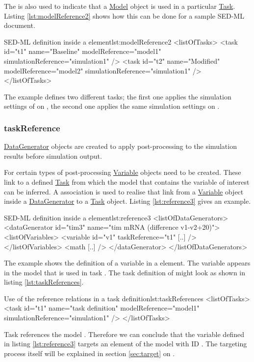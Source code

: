 The  is also used to indicate that a \hyperref[class:model]{Model} object is used in a particular  \hyperref[class:task]{Task}. Listing \ref{lst:modelReference2} shows how this can be done for a sample SED-ML document.
%
\begin{myXmlLst}{SED-ML  definition inside a  element}{lst:modelReference2}
<listOfTasks>
 <task id="t1" name="Baseline" modelReference="model1" simulationReference="simulation1" />
 <task id="t2" name="Modified" modelReference="model2" simulationReference="simulation1" />
</listOfTasks>
\end{myXmlLst}
%
The example defines two different tasks; the first one applies the simulation settings of  on , the second one applies the same simulation settings on .

\subsubsection{taskReference}
\label{sec:taskReference}
\hyperref[class:dataGenerator]{DataGenerator} objects are created to apply post-processing to the simulation results before simulation output. 

For certain types of post-processing \hyperref[class:variable]{Variable} objects need to be created. These link to a defined \hyperref[class:task]{Task} from which the model that contains the variable of interest can be inferred. 
A  association is used to realise that link from a \hyperref[class:variable]{Variable} object inside a \hyperref[class:dataGenerator]{DataGenerator} to a \hyperref[class:task]{Task} object. 
Listing \ref{lst:reference3} gives an example.
%
\begin{myXmlLst}{SED-ML  definition inside a  element}{lst:reference3}
<listOfDataGenerators>
 <dataGenerator id="tim3" name="tim mRNA (difference v1-v2+20)">
  <listOfVariables>
   <variable id="v1" taskReference="t1" [..] />
  </listOfVariables>
  <math [..] />
 </dataGenerator>
</listOfDataGenerators>
\end{myXmlLst}
%
The example shows the definition of a variable  in a  element. The variable appears in the model that is used in task . The task definition of  might look as shown in listing \ref{lst:taskReferences}.
\begin{myXmlLst}{Use of the reference relations in a task definition}{lst:taskReferences}
<listOfTasks>
  <task id="t1" name="task definition" modelReference="model1" simulationReference="simulation1" />
</listOfTasks>
\end{myXmlLst}
Task  references the model . Therefore we can conclude that the variable  defined in listing \ref{lst:reference3} targets an element of the model with ID . The targeting process itself will be explained in section \ref{sec:target} on .

